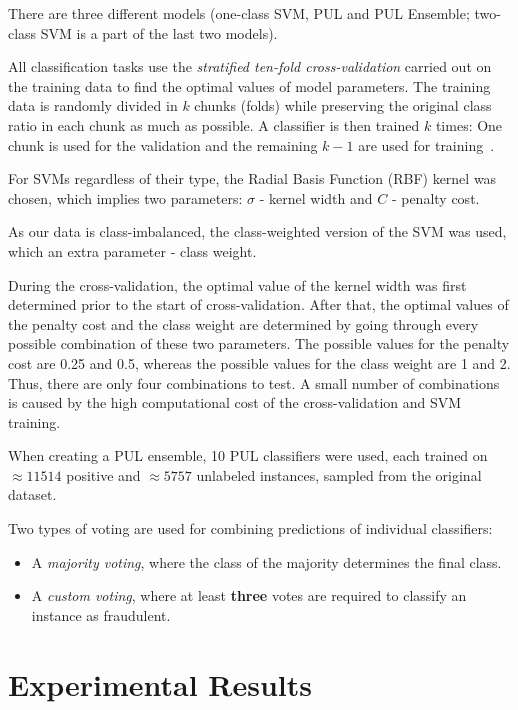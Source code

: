 There are three different models (one-class SVM, PUL and PUL Ensemble; two-class SVM is a part of the last two models).

All classification tasks use the \textit{stratified ten-fold cross-validation} carried out on the training data to find the optimal values of model parameters. The training data is randomly divided in \(k\) chunks (folds) while preserving the original class ratio in each chunk as much as possible. A classifier is then trained \(k\) times: One chunk is used for the validation and the remaining \(k-1\) are used for  training~\cite{Kohavi95}.

For SVMs regardless of their type, the Radial Basis Function (RBF) kernel was chosen, which implies two parameters: \(\sigma\) - kernel width and \(C\) - penalty cost.

As our data is class-imbalanced, the class-weighted version of the SVM was used, which an extra parameter - class weight.

During the cross-validation, the optimal value of the kernel width was first determined prior to the start of cross-validation. After that, the optimal values of the penalty cost and the class weight are determined by going through every possible combination of these two parameters. The possible values for the penalty cost are 0.25 and 0.5, whereas the possible values for the class weight are 1 and 2. Thus, there are only four combinations to test. A small number of combinations is caused by the high computational cost of the cross-validation and SVM training.

When creating a PUL ensemble, 10 PUL classifiers were used, each trained on \(\approx11514\) positive and \(\approx5757\) unlabeled instances, sampled from the original dataset.

Two types of voting are used for combining predictions of individual classifiers:

\begin{itemize}
    \item A \textit{majority voting}, where the class of the majority determines the final class.
    \item A \textit{custom voting}, where at least \textbf{three} votes are required to classify an instance as fraudulent.
\end{itemize}

\section{Experimental Results}\label{Chapter:5:Results}

